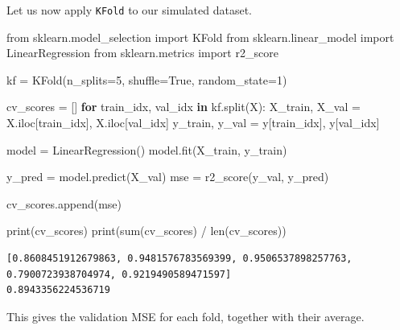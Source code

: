 \documentclass[
  letterpaper,
  DIV=11,
  numbers=noendperiod]{scrreprt}
\newenvironment{Shaded}{\begin{snugshade}}{\end{snugshade}}
\newcommand{\BuiltInTok}[1]{\textcolor[rgb]{0.00,0.23,0.31}{#1}}
\newcommand{\ControlFlowTok}[1]{\textcolor[rgb]{0.00,0.23,0.31}{\textbf{#1}}}
\newcommand{\DecValTok}[1]{\textcolor[rgb]{0.68,0.00,0.00}{#1}}
\newcommand{\ImportTok}[1]{\textcolor[rgb]{0.00,0.46,0.62}{#1}}
\newcommand{\KeywordTok}[1]{\textcolor[rgb]{0.00,0.23,0.31}{\textbf{#1}}}
\newcommand{\NormalTok}[1]{\textcolor[rgb]{0.00,0.23,0.31}{#1}}
\newcommand{\OperatorTok}[1]{\textcolor[rgb]{0.37,0.37,0.37}{#1}}
\newcommand{\VariableTok}[1]{\textcolor[rgb]{0.07,0.07,0.07}{#1}}
\theoremstyle{definition}
\theoremstyle{definition}
\theoremstyle{plain}
\theoremstyle{plain}
\theoremstyle{remark}
\begin{document}
\begin{tcolorbox}
Let us now apply \texttt{KFold} to our simulated dataset.

\begin{Shaded}
\begin{Highlighting}[]
\ImportTok{from}\NormalTok{ sklearn.model\_selection }\ImportTok{import}\NormalTok{ KFold}
\ImportTok{from}\NormalTok{ sklearn.linear\_model }\ImportTok{import}\NormalTok{ LinearRegression}
\ImportTok{from}\NormalTok{ sklearn.metrics }\ImportTok{import}\NormalTok{ r2\_score}

\NormalTok{kf }\OperatorTok{=}\NormalTok{ KFold(n\_splits}\OperatorTok{=}\DecValTok{5}\NormalTok{, shuffle}\OperatorTok{=}\VariableTok{True}\NormalTok{, random\_state}\OperatorTok{=}\DecValTok{1}\NormalTok{)}

\NormalTok{cv\_scores }\OperatorTok{=}\NormalTok{ []}
\ControlFlowTok{for}\NormalTok{ train\_idx, val\_idx }\KeywordTok{in}\NormalTok{ kf.split(X):}
\NormalTok{    X\_train, X\_val }\OperatorTok{=}\NormalTok{ X.iloc[train\_idx], X.iloc[val\_idx]}
\NormalTok{    y\_train, y\_val }\OperatorTok{=}\NormalTok{ y[train\_idx], y[val\_idx]}

\NormalTok{    model }\OperatorTok{=}\NormalTok{ LinearRegression()}
\NormalTok{    model.fit(X\_train, y\_train)}

\NormalTok{    y\_pred }\OperatorTok{=}\NormalTok{ model.predict(X\_val)}
\NormalTok{    mse }\OperatorTok{=}\NormalTok{ r2\_score(y\_val, y\_pred)}

\NormalTok{    cv\_scores.append(mse)}

\BuiltInTok{print}\NormalTok{(cv\_scores)}
\BuiltInTok{print}\NormalTok{(}\BuiltInTok{sum}\NormalTok{(cv\_scores) }\OperatorTok{/} \BuiltInTok{len}\NormalTok{(cv\_scores))}
\end{Highlighting}
\end{Shaded}

\begin{verbatim}
[0.8608451912679863, 0.9481576783569399, 0.9506537898257763, 0.7900723938704974, 0.9219490589471597]
0.8943356224536719
\end{verbatim}

This gives the validation MSE for each fold, together with their
average.

\end{tcolorbox}
\end{document}
